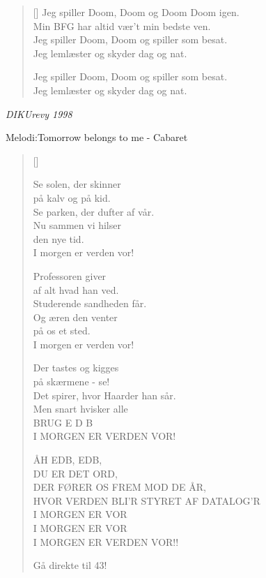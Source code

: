 {\begin{multicols}
\begin{verse}[\versewidth]
Jeg spiller Doom, Doom og Doom Doom igen.\\
Min BFG har altid vær't min bedste ven.\\
Jeg spiller Doom, Doom og spiller som besat.\\
Jeg lemlæster og skyder dag og nat.

Jeg spiller Doom, Doom og spiller som besat.\\
Jeg lemlæster og skyder dag og nat.
\end{verse}
\end{multicols}
}

\newpage


{\small\itshape DIKUrevy 1998}
\begin{multicols}{2}
{Melodi:Tomorrow belongs to me - Cabaret}
\settowidth{\versewidth}{[F]HVOR VERDEN BLI'R [C]STYRET [Em]AF DATA[Am]LOG'R}
\begin{verse}[\versewidth]

Se solen, der skinner\\
på kalv og på kid.\\
Se parken, der dufter af vår.\\
Nu sammen vi hilser\\
den nye tid.\\
I morgen er verden vor!

Professoren giver\\
af alt hvad han ved.\\
Studerende sandheden får.\\
Og æren den venter\\
på os et sted.\\
I morgen er verden vor!

Der tastes og kigges\\
på skærmene - se!\\
Det spirer, hvor Haarder han sår.\\
Men snart hvisker alle\\
BRUG  E D B\\
I MORGEN ER VERDEN VOR!

ÅH EDB, EDB,\\
DU ER DET ORD,\\
DER FØRER OS FREM MOD DE ÅR,\\
HVOR VERDEN BLI'R STYRET AF DATALOG'R\\
I MORGEN ER VOR\\
I MORGEN ER VOR\\
I MORGEN ER VERDEN VOR!!


\tiny{Gå direkte til 43!}

\end{verse}
\end{multicols}

